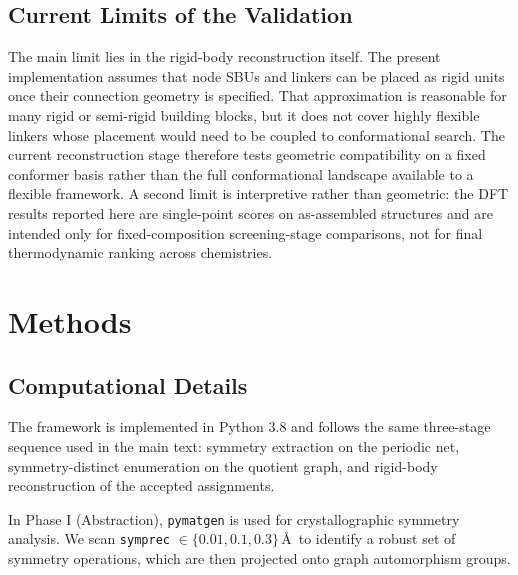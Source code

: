 \documentclass[pdflatex,sn-mathphys-num]{sn-jnl}
\theoremstyle{thmstyleone}%
\begin{document}
\subsection*{Current Limits of the Validation}
\label{sec:limits}
The main limit lies in the rigid-body reconstruction itself. The present implementation assumes that node SBUs and linkers can be placed as rigid units once their connection geometry is specified. That approximation is reasonable for many rigid or semi-rigid building blocks, but it does not cover highly flexible linkers whose placement would need to be coupled to conformational search. The current reconstruction stage therefore tests geometric compatibility on a fixed conformer basis rather than the full conformational landscape available to a flexible framework. A second limit is interpretive rather than geometric: the DFT results reported here are single-point scores on as-assembled structures and are intended only for fixed-composition screening-stage comparisons, not for final thermodynamic ranking across chemistries.

\section*{Methods}
\subsection*{Computational Details}
The framework is implemented in Python 3.8 and follows the same three-stage sequence used in the main text: symmetry extraction on the periodic net, symmetry-distinct enumeration on the quotient graph, and rigid-body reconstruction of the accepted assignments.

In Phase I (Abstraction), \texttt{pymatgen} is used for crystallographic symmetry analysis. We scan \texttt{symprec} $\in \{0.01, 0.1, 0.3\}$\,\AA\ to identify a robust set of symmetry operations, which are then projected onto graph automorphism groups.
\end{document}
